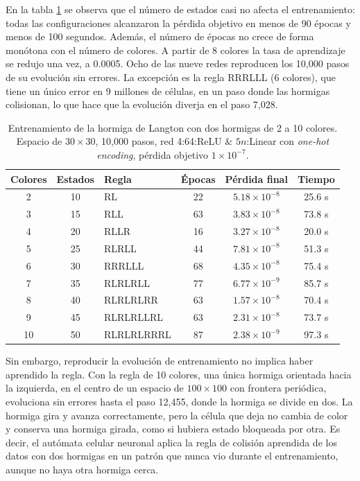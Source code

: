 En la tabla \ref{tab:langton_colores} se observa que el número de estados casi no afecta el entrenamiento: todas las configuraciones alcanzaron la pérdida objetivo en menos de 90 épocas y menos de 100 segundos. Además, el número de épocas no crece de forma monótona con el número de colores. A partir de 8 colores la tasa de aprendizaje se redujo una vez, a 0.0005. Ocho de las nueve redes reproducen los 10,000 pasos de su evolución sin errores. La excepción es la regla RRRLLL (6 colores), que tiene un único error en 9 millones de células, en un paso donde las hormigas colisionan, lo que hace que la evolución diverja en el paso 7,028.

\begin{table}[H]
	\centering
	\begin{tabular}{c c l c c c}
		\toprule
		Colores & Estados & Regla & Épocas & Pérdida final & Tiempo \\
		\midrule
		2  & 10 & RL         & 22 & $5.18 \times 10^{-8}$ & 25.6 s \\
		3  & 15 & RLL        & 63 & $3.83 \times 10^{-8}$ & 73.8 s \\
		4  & 20 & RLLR       & 16 & $3.27 \times 10^{-8}$ & 20.0 s \\
		5  & 25 & RLRLL      & 44 & $7.81 \times 10^{-8}$ & 51.3 s \\
		6  & 30 & RRRLLL     & 68 & $4.35 \times 10^{-8}$ & 75.4 s \\
		7  & 35 & RLRLRLL    & 77 & $6.77 \times 10^{-9}$ & 85.7 s \\
		8  & 40 & RLRLRLRR   & 63 & $1.57 \times 10^{-8}$ & 70.4 s \\
		9  & 45 & RLRLRLLRL  & 63 & $2.31 \times 10^{-8}$ & 73.7 s \\
		10 & 50 & RLRLRLRRRL & 87 & $2.38 \times 10^{-9}$ & 97.3 s \\
		\bottomrule
	\end{tabular}
	\caption{Entrenamiento de la hormiga de Langton con dos hormigas de 2 a 10 colores. Espacio de $30 \times 30$, 10,000 pasos, red 4:64:ReLU \& $5n$:Linear con \textit{one-hot encoding}, pérdida objetivo $1 \times 10^{-7}$.}
	\label{tab:langton_colores}
\end{table}

Sin embargo, reproducir la evolución de entrenamiento no implica haber aprendido la regla. Con la regla de 10 colores, una única hormiga orientada hacia la izquierda, en el centro de un espacio de $100 \times 100$ con frontera periódica, evoluciona sin errores hasta el paso 12,455, donde la hormiga se divide en dos. La hormiga gira y avanza correctamente, pero la célula que deja no cambia de color y conserva una hormiga girada, como si hubiera estado bloqueada por otra. Es decir, el autómata celular neuronal aplica la regla de colisión aprendida de los datos con dos hormigas en un patrón que nunca vio durante el entrenamiento, aunque no haya otra hormiga cerca.

